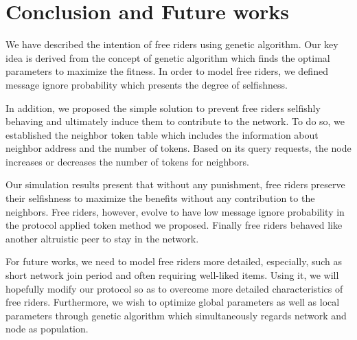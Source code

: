 \documentclass[12pt,journal,draftcls,letterpaper,onecolumn]{IEEEtran}
\begin{document}
\section{Conclusion and Future works}\label{sec:concl}

We have described the intention of free riders using genetic algorithm. Our key idea is
derived from the concept of genetic algorithm which finds the optimal parameters to
maximize the fitness. In order to model free riders, we defined message ignore probability
which presents the degree of selfishness.

In addition, we proposed the simple solution to prevent free riders selfishly behaving and
ultimately induce them to contribute to the network. To do so, we established the neighbor
token table which includes the information about neighbor address and the number of tokens.
Based on its query requests, the node increases or decreases the number of tokens for
neighbors.

Our simulation results present that without any punishment, free riders preserve their
selfishness to maximize the benefits without any contribution to the neighbors. Free riders,
however, evolve to have low message ignore probability in the protocol applied token method
we proposed. Finally free riders behaved like another altruistic peer to stay in the network.

For future works, we need to model free riders more detailed, especially, such as short
network join period and often requiring well-liked items. Using it, we will hopefully modify
our protocol so as to overcome more detailed characteristics of free riders. Furthermore, we
wish to optimize global parameters as well as local parameters through genetic algorithm
which simultaneously regards network and node as population.



\end{document}
